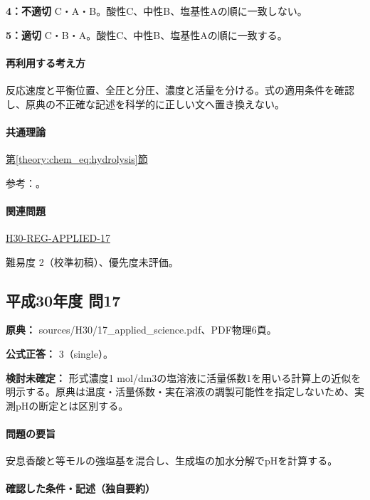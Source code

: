 \noindent\textbf{4：不適切} C・A・B。酸性C、中性B、塩基性Aの順に一致しない。\par

\noindent\textbf{5：適切} C・B・A。酸性C、中性B、塩基性Aの順に一致する。\par

\paragraph{再利用する考え方} 反応速度と平衡位置、全圧と分圧、濃度と活量を分ける。式の適用条件を確認し、原典の不正確な記述を科学的に正しい文へ置き換えない。

\paragraph{共通理論} \hyperref[theory:chem_eq:hydrolysis]{第\ref*{theory:chem_eq:hydrolysis}節}

\par 参考：\cite{iupac_greenbook2012,mit_buffer2008}。

\paragraph{関連問題} \hyperref[q:h30-reg-applied-17]{H30-REG-APPLIED-17}

\par 難易度 2（校準初稿）、優先度未評価。

\subsection{平成30年度 問17}
\label{q:h30-reg-applied-17}

\noindent\textbf{原典：} sources/H30/17\_applied\_science.pdf、PDF物理6頁。

\textbf{公式正答：} 3（single）。

\par\textbf{検討未確定：} 形式濃度1 mol/dm3の塩溶液に活量係数1を用いる計算上の近似を明示する。原典は温度・活量係数・実在溶液の調製可能性を指定しないため、実測pHの断定とは区別する。

\paragraph{問題の要旨} 安息香酸と等モルの強塩基を混合し、生成塩の加水分解でpHを計算する。

\paragraph{確認した条件・記述（独自要約）}\mbox{}\par

